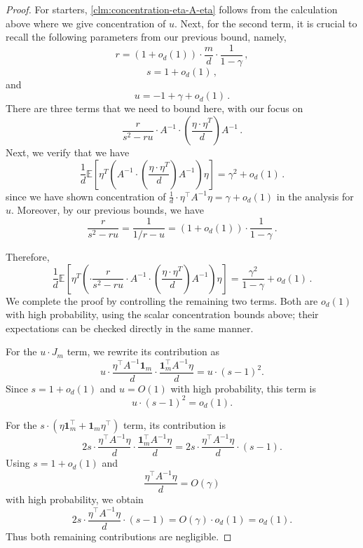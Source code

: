 \documentclass[12pt]{article}
\def \E {\mathbb{E}}
\newcommand{\gam}{\gamma}
\begin{document}
\begin{proof}
	For starters, \cref{clm:concentration-eta-A-eta} follows from the calculation above where we give concentration of $u$. Next, for the second term, it is crucial to recall the following parameters from our previous bound, namely,\[ 
	 r= (1+o_d(1)) \cdot  \frac{m}{d} \cdot \frac{1}{1-\gamma} \,,
	\]
	\[
	s = 1+ o_d(1)\,,
	 \]
	 and \[
	 u = -1 +\gam +o_d(1) \,.
	  \]
	There are three terms that we need to bound here, with our focus on \[ 
	\frac{r}{s^2-ru} \cdot A^{-1} \cdot (\frac{\eta\cdot \eta^T}{d}) A^{-1}\,.
	\] 
Next, we verify that we have
\[ 
	\frac{1}{d}\E [\eta^T ( A^{-1} \cdot (\frac{\eta\cdot \eta^T}{d}) A^{-1}) \eta ] =    \gam^2 +o_d(1)\,.
	\]
	since we have shown concentration of $\frac{1}{d}\cdot \eta^\top A^{-1} \eta =  \gamma +o_d(1) $ in the analysis for $u$.
	Moreover, by our previous bounds, we have
	\[
	\frac{r}{s^2-ru} =  \frac{1}{1/r-u} =  (1+o_d(1)) \cdot \frac{1}{1-\gamma}\,.
	 \]
	 
	 Therefore, \[ 
	 \frac{1}{d}\E\left[\eta^T(  \cdot \frac{r}{s^2-ru} \cdot  A^{-1} \cdot (\frac{\eta\cdot \eta^T}{d}) A^{-1} ) \eta   \right]  = \frac{\gamma^2}{1-\gamma} +o_d(1) \,.
	 \]
	We complete the proof by controlling the remaining two terms. Both are
\(o_d(1)\) with high probability, using the scalar concentration bounds above;
their expectations can be checked directly in the same manner.

For the \(u\cdot J_m\) term, we rewrite its contribution as
\[
    u \cdot
    \frac{\eta^\top A^{-1}\mathbf 1_m}{d}
    \cdot
    \frac{\mathbf 1_m^\top A^{-1}\eta}{d}
    =
    u\cdot (s-1)^2.
\]
Since \(s=1+o_d(1)\) and \(u=O(1)\) with high probability, this term is
\[
    u\cdot (s-1)^2=o_d(1).
\]

For the \(s\cdot(\eta\mathbf 1_m^\top+\mathbf 1_m\eta^\top)\) term, its contribution is
\[
    2s\cdot
    \frac{\eta^\top A^{-1}\eta}{d}
    \cdot
    \frac{\mathbf 1_m^\top A^{-1}\eta}{d}
    =
    2s\cdot
    \frac{\eta^\top A^{-1}\eta}{d}
    \cdot (s-1).
\]
Using \(s=1+o_d(1)\) and
\[
    \frac{\eta^\top A^{-1}\eta}{d}=O(\gamma)
\]
with high probability, we obtain
\[
    2s\cdot
    \frac{\eta^\top A^{-1}\eta}{d}
    \cdot (s-1)
    =
    O(\gamma)\cdot o_d(1)
    =
    o_d(1).
\]
Thus both remaining contributions are negligible.\end{proof}
	
\end{document}
